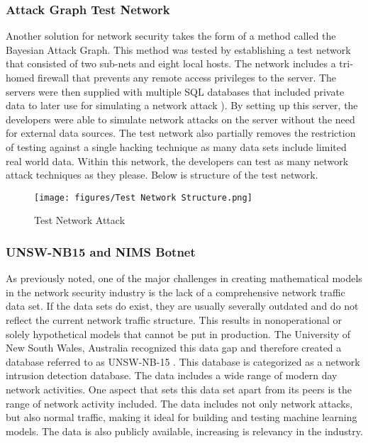 \documentclass{article}
\begin{document}
\subsubsection{Attack Graph Test Network}
Another solution for network security takes the form of a method called the Bayesian Attack Graph. This method was tested by establishing a test network that consisted of two sub-nets and eight local hosts. The network includes a tri-homed firewall that prevents any remote access privileges to the server. The servers were then supplied with multiple SQL databases that included private data to later use for simulating a network attack \cite{poolsappasit2011dynamic}). By setting up this server, the developers were able to simulate network attacks on the server without the need for external data sources. The test network also partially removes the restriction of testing against a single hacking technique as many data sets include limited real world data. Within this network, the developers can test as many network attack techniques as they please. Below is structure of the test network.

\begin{figure}
    \centering
    \texttt{[image: figures/Test Network Structure.png]}
    \caption{Test Network Attack}
    \label{fig:enter-label}
\end{figure}

\subsubsection{UNSW-NB15 and NIMS Botnet} 
As previously noted, one of the major challenges in creating mathematical models in the network security industry is the lack of a comprehensive network traffic data set. If the data sets do exist, they are usually severally outdated and do not reflect the current network traffic structure. This results in nonoperational or solely hypothetical models that cannot be put in production. The University of New South Wales, Australia recognized this data gap and therefore created a database referred to as UNSW-NB-15 \cite{UNSW2018}. This database is categorized as a network intrusion detection database. The data includes a wide range of modern day network activities. One aspect that sets this data set apart from its peers is the range of network activity included. The data includes not only network attacks, but also normal traffic, making it ideal for building and testing machine learning models. The data is also publicly available, increasing is relevancy in the industry. 
\end{document}
